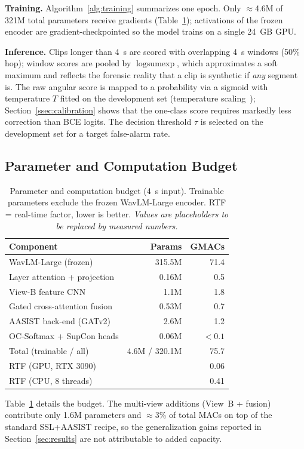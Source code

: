 \noindent\textbf{Training.} Algorithm~\ref{alg:training} summarizes one epoch. Only
$\approx$4.6M of 321M total parameters receive gradients (Table~\ref{tab:budget});
activations of the frozen encoder are gradient-checkpointed so the model trains on a
single 24~GB GPU.

\noindent\textbf{Inference.} Clips longer than 4~s are scored with overlapping 4~s
windows (50\% hop); window scores are pooled by $\operatorname{logsumexp}$, which
approximates a soft maximum and reflects the forensic reality that a clip is synthetic
if \emph{any} segment is. The raw angular score is mapped to a probability via a
sigmoid with temperature $T$ fitted on the development set (temperature
scaling~\cite{guo2017calibration}); Section~\ref{ssec:calibration} shows that the
one-class score requires markedly less correction than BCE logits. The decision
threshold $\tau$ is selected on the development set for a target false-alarm rate.

\subsection{Parameter and Computation Budget}
\label{ssec:budget}

\begin{table}[t]
\centering
\caption{Parameter and computation budget (4~s input). Trainable parameters exclude
  the frozen WavLM-Large encoder. RTF = real-time factor, lower is better.
  \emph{Values are placeholders to be replaced by measured numbers.}}
\label{tab:budget}
\footnotesize
\setlength{\tabcolsep}{4pt}
\begin{tabular}{lrr}
\toprule
Component & Params & GMACs \\
\midrule
WavLM-Large (frozen)            & 315.5M & 71.4 \\
Layer attention + projection    & 0.16M  & 0.5  \\
View-B feature CNN              & 1.1M   & 1.8  \\
Gated cross-attention fusion    & 0.53M  & 0.7  \\
AASIST back-end (GATv2)         & 2.6M   & 1.2  \\
OC-Softmax + SupCon heads       & 0.06M  & $<0.1$ \\
\midrule
Total (trainable / all)         & 4.6M / 320.1M & 75.7 \\
\midrule
RTF (GPU, RTX 3090)             & \multicolumn{2}{r}{0.06} \\
RTF (CPU, 8 threads)            & \multicolumn{2}{r}{0.41} \\
\bottomrule
\end{tabular}
\end{table}

Table~\ref{tab:budget} details the budget. The multi-view additions (View~B + fusion)
contribute only 1.6M parameters and $\approx$3\% of total MACs on top of the standard
SSL+AASIST recipe, so the generalization gains reported in Section~\ref{sec:results}
are not attributable to added capacity.
